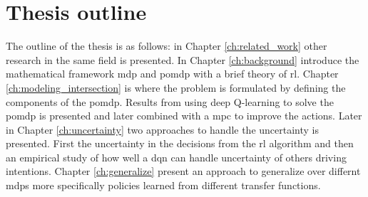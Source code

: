 \section{Thesis outline}
The outline of the thesis is as follows: in Chapter \ref{ch:related_work} other research in the same field is presented. In Chapter \ref{ch:background} introduce the mathematical framework \gls{mdp} and \gls{pomdp} with a brief theory of \gls{rl}. 
Chapter \ref{ch:modeling_intersection} is where the problem is formulated by defining the components of the \gls{pomdp}. Results from using deep Q-learning to solve the \gls{pomdp} is presented and later combined with a \gls{mpc} to improve the actions. Later in Chapter \ref{ch:uncertainty} two approaches to handle the uncertainty is presented. First the uncertainty in the decisions from the \gls{rl} algorithm and then an empirical study of how well a \gls{dqn} can handle uncertainty of others driving intentions. Chapter \ref{ch:generalize} present an approach to generalize over differnt \gls{mdp}s more specifically policies learned from different transfer functions. 


